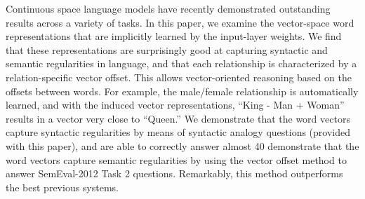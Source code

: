 Continuous space language models have recently demonstrated outstanding results across a variety of tasks. In this paper, we examine the vector-space word
 representations that are implicitly learned by the input-layer weights. We find
 that these representations are surprisingly good at capturing syntactic
 and semantic regularities in language, and that each relationship is
 characterized by a relation-specific vector offset. This allows vector-oriented
 reasoning based on the offsets between words. For example, the male/female
 relationship is automatically learned, and with the induced vector
 representations, ``King - Man + Woman'' results in a vector very close to
 ``Queen.'' We demonstrate that the word vectors capture syntactic
 regularities by means of syntactic analogy questions (provided with this
 paper), and are able to correctly answer almost 40%
 demonstrate that the word vectors capture semantic regularities by using the
 vector offset method to answer SemEval-2012 Task 2 questions. Remarkably, this
 method outperforms the best previous systems.

